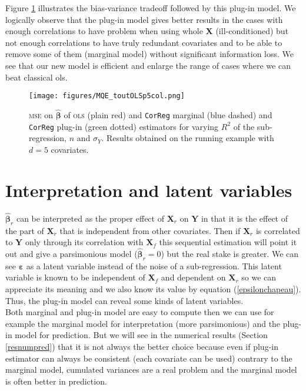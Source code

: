 \documentclass[12pt,a4paper]{report}
\begin{document}
	Figure \ref{MQE2} illustrates the bias-variance tradeoff followed by this plug-in model. We logically observe that the plug-in model gives better results in the cases with enough correlations to have problem when using whole $\boldsymbol{X}$ (ill-conditioned) but not enough correlations to have truly redundant covariates and to be able to remove some of them (marginal model) without significant information loss. We see that our new model is efficient and enlarge the range of cases where we can beat classical {\sc ols}.
\begin{figure}[h!]
	\texttt{[image: figures/MQE\_toutOLSp5col.png]}
	\caption{\textsc{mse} on $\hat{\boldsymbol{\beta}}$ of \textsc{ols} (plain red) and {\tt CorReg} marginal (blue dashed) and {\tt CorReg} plug-in (green dotted) estimators for varying $R^2$ of the sub-regression, $n$ and $\sigma_Y$. Results obtained on the running example with $d=5$ covariates.}\label{MQE2}
\end{figure}	
			
		
	\section{Interpretation and latent variables}
			$\hat{\boldsymbol{\beta}}_{r}$ can be interpreted as the proper effect of $\boldsymbol{X}_r$ on $\boldsymbol{Y}$ in that it is the effect of the part of $\boldsymbol{X}_r$ that is independent from other covariates. Then if $\boldsymbol{X}_r$ is correlated to $\boldsymbol{Y}$ only through its correlation with $\boldsymbol{X}_f$ this sequential estimation will point it out and give a parsimonious model ($\hat{\boldsymbol{\beta}}_r=0$) but the real stake is greater. We can see $\boldsymbol{\varepsilon}$ as a latent variable instead of the noise of a sub-regression. This latent variable is known to be independent of $\boldsymbol{X}_f$ and dependent on $\boldsymbol{X}_r$ so we can appreciate its meaning and we also know its value by equation (\ref{epsilonchapeau}). Thus, the plug-in model can reveal some kinds of latent variables.\\
			
			Both marginal and plug-in model are easy to compute then we can use for example the marginal model for interpretation (more parsimonious) and the plug-in model for prediction. But we will see in the numerical results (Section \ref{resnumpred}) that it is not always the better choice because even if plug-in estimator can always be consistent (each covariate can be used) contrary to the marginal model, cumulated variances are a real problem and the marginal model is often better in prediction.
			
\end{document}
